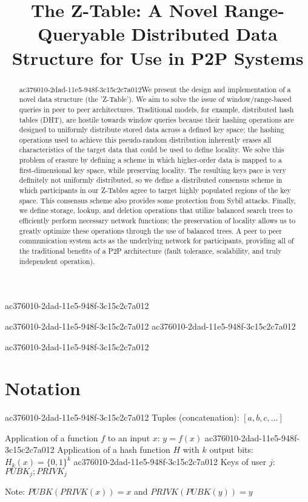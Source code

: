 \documentclass[12pt]{article}
\title{The Z-Table: A Novel Range-Queryable Distributed Data Structure for Use in P2P Systems}
\begin{document}
ac376010-2dad-11e5-948f-3c15c2c7a012
\maketitle
ac376010-2dad-11e5-948f-3c15c2c7a012
ac376010-2dad-11e5-948f-3c15c2c7a012\begin{abstract}
ac376010-2dad-11e5-948f-3c15c2c7a012We present the design and implementation of a novel data structure (the 'Z-Table'). We aim to solve the issue of window/range-based queries in peer to peer architectures. Traditional models, for example,  distributed hash tables (DHT), are hostile towards window queries because their hashing operations are designed to uniformly distribute stored data across a defined key space; the hashing operations used to achieve this pseudo-random distribution inherently erases all characteristics of the target data that could be used to define locality. We solve this problem of erasure by defining a scheme in which higher-order data is mapped to a first-dimensional key space, while preserving locality. The resulting keys pace is very definitely not uniformly distributed, so we define a distributed consensus scheme in which participants in our Z-Tables agree to target highly populated regions of the key space. This consensus scheme also provides some protection from Sybil attacks. Finally, we define storage, lookup, and deletion operations that utilize balanced search trees to efficiently perform necessary network functions; the preservation of locality allows us to greatly optimize these operations through the use of balanced trees. A peer to peer communication system acts as the underlying network for participants, providing all of the traditional benefits of a P2P architecture (fault tolerance, scalability, and truly independent operation).
\end{abstract}

ac376010-2dad-11e5-948f-3c15c2c7a012\section{Notation}
ac376010-2dad-11e5-948f-3c15c2c7a012
Tuples (concatenation): $[a,b,c,...]$

Application of a function $f$ to an input $x$: $y=f(x)$
ac376010-2dad-11e5-948f-3c15c2c7a012
Application of a hash function $H$ with $k$ output bits: $H_{k}(x) = \{0,1\}^k$
ac376010-2dad-11e5-948f-3c15c2c7a012
Keys of user $j$: $ PUBK_j; PRIVK_j $

Note: $PUBK(PRIVK(x)) = x$ and $PRIVK(PUBK(y)) = y$~
\end{document}
